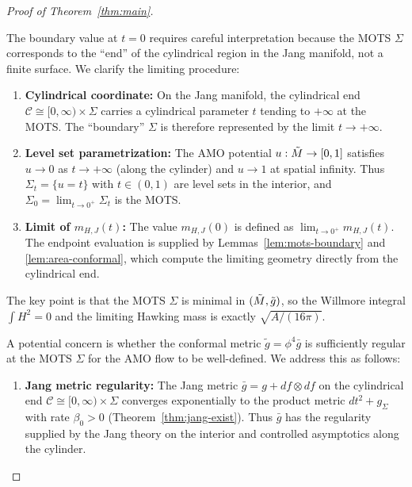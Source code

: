 \begin{proof}[Proof of Theorem~\ref{thm:main}]
\begin{remark}[Clarification: Cylindrical End vs.\ Level Set at $t = 0$]\label{rem:t0-clarification}
The boundary value at $t = 0$ requires careful interpretation because the MOTS $\Sigma$ corresponds to the ``end'' of the cylindrical region in the Jang manifold, not a finite surface. We clarify the limiting procedure:
\begin{enumerate}
    \item \textbf{Cylindrical coordinate:} On the Jang manifold, the cylindrical end $\mathcal{C} \cong [0, \infty) \times \Sigma$ carries a cylindrical parameter $t$ tending to $+\infty$ at the MOTS. The ``boundary'' $\Sigma$ is therefore represented by the limit $t \to +\infty$.
    \item \textbf{Level set parametrization:} The AMO potential $u: \tilde{M} \to [0, 1]$ satisfies $u \to 0$ as $t \to +\infty$ (along the cylinder) and $u \to 1$ at spatial infinity. Thus $\Sigma_t = \{u = t\}$ with $t \in (0, 1)$ are level sets in the interior, and $\Sigma_0 = \lim_{t \to 0^+} \Sigma_t$ is the MOTS.
    \item \textbf{Limit of $m_{H,J}(t)$:} The value $m_{H,J}(0)$ is defined as $\lim_{t \to 0^+} m_{H,J}(t)$. The endpoint evaluation is supplied by Lemmas~\ref{lem:mots-boundary} and \ref{lem:area-conformal}, which compute the limiting geometry directly from the cylindrical end.
\end{enumerate}
The key point is that the MOTS $\Sigma$ is minimal in $(\tilde{M}, \tilde{g})$, so the Willmore integral $\int H^2 = 0$ and the limiting Hawking mass is exactly $\sqrt{A/(16\pi)}$.
\end{remark}

\begin{remark}\label{rem:conformal-regularity-mots}
A potential concern is whether the conformal metric $\tilde{g} = \phi^4 \bar{g}$ is sufficiently regular at the MOTS $\Sigma$ for the AMO flow to be well-defined. We address this as follows:
\begin{enumerate}
    \item \textbf{Jang metric regularity:} The Jang metric $\bar{g} = g + df \otimes df$ on the cylindrical end $\mathcal{C} \cong [0,\infty) \times \Sigma$ converges exponentially to the product metric $dt^2 + g_\Sigma$ with rate $\beta_0 > 0$ (Theorem~\ref{thm:jang-exist}). Thus $\bar{g}$ has the regularity supplied by the Jang theory on the interior and controlled asymptotics along the cylinder.
    

\end{enumerate}
\end{remark}
\end{proof}
